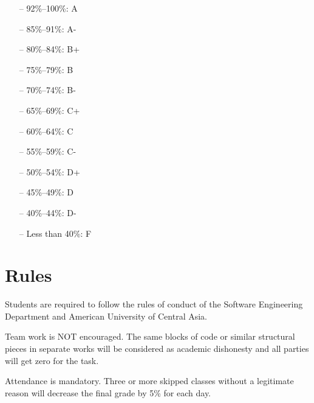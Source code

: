 \documentclass[12pt,a4paper,oneside]{article}
\begin{document}
        \begin{itemize} \itemsep-10pt \parskip0pt 
            \item[--] 92\%--100\%: A\\
            \item[--] 85\%--91\%: A-\\
            \item[--] 80\%--84\%: B+\\
            \item[--] 75\%--79\%: B\\
            \item[--] 70\%--74\%: B-\\
            \item[--] 65\%--69\%: C+\\
            \item[--] 60\%--64\%: C\\
            \item[--] 55\%--59\%: C-\\
            \item[--] 50\%--54\%: D+\\
            \item[--] 45\%--49\%: D\\
            \item[--] 40\%--44\%: D-\\
            \item[--] Less than 40\%: F
        \end{itemize}

    \section{Rules}

        Students are required to follow the rules of conduct of the Software
        Engineering Department and American University of Central Asia.

        Team work is NOT encouraged. The same blocks of code or similar
        structural pieces in separate works will be considered as academic
        dishonesty and all parties will get zero for the task.

        Attendance is mandatory. Three or more skipped classes without a
        legitimate reason will decrease the final grade by 5\% for each day.
\end{document}
